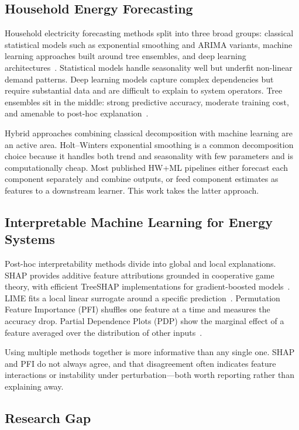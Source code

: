 \documentclass[10pt,twocolumn,letterpaper]{article}
\begin{document}
\subsection{Household Energy Forecasting}

Household electricity forecasting methods split into three broad groups:
classical statistical models such as exponential smoothing and ARIMA
variants, machine learning approaches built around tree ensembles, and
deep learning architectures~\cite{hyndman2021}. Statistical models
handle seasonality well but underfit non-linear demand patterns. Deep
learning models capture complex dependencies but require substantial
data and are difficult to explain to system operators. Tree ensembles
sit in the middle: strong predictive accuracy, moderate training cost,
and amenable to post-hoc explanation~\cite{chen2016xgboost}.

Hybrid approaches combining classical decomposition with machine
learning are an active area. Holt--Winters exponential smoothing is a
common decomposition choice because it handles both trend and
seasonality with few parameters and is computationally cheap. Most
published HW+ML pipelines either forecast each component separately
and combine outputs, or feed component estimates as features to a
downstream learner. This work takes the latter approach.

\subsection{Interpretable Machine Learning for Energy Systems}

Post-hoc interpretability methods divide into global and local
explanations. SHAP provides additive feature attributions grounded in
cooperative game theory, with efficient TreeSHAP implementations for
gradient-boosted models~\cite{lundberg2017shap}. LIME fits a local
linear surrogate around a specific prediction~\cite{ribeiro2016lime}.
Permutation Feature Importance (PFI) shuffles one feature at a time
and measures the accuracy drop. Partial Dependence Plots (PDP) show
the marginal effect of a feature averaged over the distribution of
other inputs~\cite{goldstein2015peeking}.

Using multiple methods together is more informative than any single
one. SHAP and PFI do not always agree, and that disagreement often
indicates feature interactions or instability under perturbation---both
worth reporting rather than explaining away.

\subsection{Research Gap}
\end{document}
